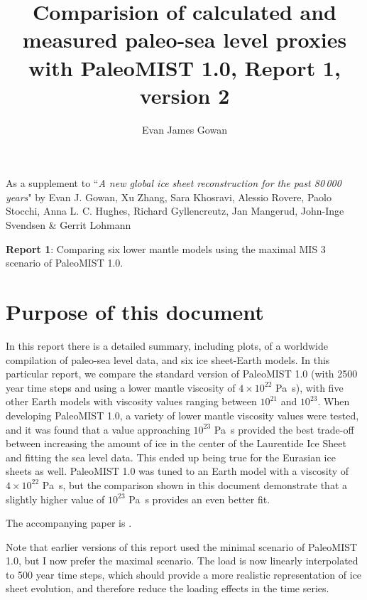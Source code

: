 \documentclass[a4paper,12pt]{article}
\begin{document}
\title{Comparision of calculated and measured paleo-sea level proxies with PaleoMIST 1.0, Report 1, version 2}

\author{Evan James Gowan}
    
\date{}

\maketitle

\normalsize As a supplement to ``\emph{A new global ice sheet reconstruction for the past 80\,000 years}" by Evan J. Gowan, Xu Zhang, Sara Khosravi, Alessio Rovere, Paolo Stocchi, Anna L. C. Hughes, Richard Gyllencreutz, Jan Mangerud, John-Inge Svendsen \& Gerrit Lohmann

\textbf{Report 1}: Comparing six lower mantle models using the maximal MIS 3 scenario of PaleoMIST 1.0.

\newpage

\tableofcontents

\newpage

\section{Purpose of this document}

In this report there is a detailed summary, including plots, of a worldwide compilation of paleo-sea level data, and six ice sheet-Earth models. In this particular report, we compare the standard version of PaleoMIST 1.0 (with 2500 year time steps and using a lower mantle viscosity of $4\times10^{22}$ Pa~s), with five other Earth models with viscosity values ranging between $10^{21}$ and $10^{23}$. When developing PaleoMIST 1.0, a variety of lower mantle viscosity values were tested, and it was found that a value approaching $10^{23}$ Pa~s provided the best trade-off between increasing the amount of ice in the center of the Laurentide Ice Sheet and fitting the sea level data. This ended up being true for the Eurasian ice sheets as well. PaleoMIST 1.0 was tuned to an Earth model with a viscosity of $4\times10^{22}$ Pa~s, but the comparison shown in this document demonstrate that a slightly higher value of $10^{23}$ Pa~s provides an even better fit.

The accompanying paper is \citet{GowanEtal2021b}.

Note that earlier versions of this report used the minimal scenario of PaleoMIST 1.0, but I now prefer the maximal scenario. The load is now linearly interpolated to 500 year time steps, which should provide a more realistic representation of ice sheet evolution, and therefore reduce the loading effects in the time series.
\end{document}
